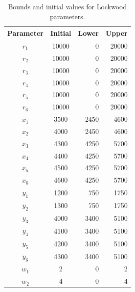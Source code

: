 \documentclass[11pt]{article}
\begin{document}
\begin{table}
\begin{center}
 \begin{tabular}{|c|c|rr|}
\hline
\textbf{Parameter} & \textbf{Initial} & \textbf{Lower} & \textbf{Upper} \\ \hline 
$r_1$ & 10000 &  0    &  20000 \\
$r_2$ & 10000 &  0    &  20000 \\
$r_3$ & 10000 &  0    &  20000 \\
$r_4$ & 10000 &  0    &  20000 \\
$r_5$ & 10000 &  0    &  20000 \\
$r_6$ & 10000 &  0    &  20000 \\
$x_1$ &  3500 &  2450 &   4600 \\
$x_2$ &  4000 &  2450 &   4600 \\
$x_3$ &  4300 &  4250 &   5700 \\
$x_4$ &  4400 &  4250 &   5700 \\
$x_5$ &  4500 &  4250 &   5700 \\
$x_6$ &  4600 &  4250 &   5700 \\
$y_1$ &  1200 &   750 &   1750 \\
$y_2$ &  1300 &   750 &   1750 \\
$y_3$ &  4000 &  3400 &   5100 \\
$y_4$ &  4100 &  3400 &   5100 \\
$y_5$ &  4200 &  3400 &   5100 \\
$y_6$ &  4300 &  3400 &   5100 \\ 
$w_1$ &     2 &     0 &      2 \\
$w_2$ &     4 &     0 &      4 \\\hline
 \end{tabular}
\end{center}
\caption{\label{tab:lockwood} Bounds and initial values for Lockwood parameters.}
\end{table}



\end{document}

